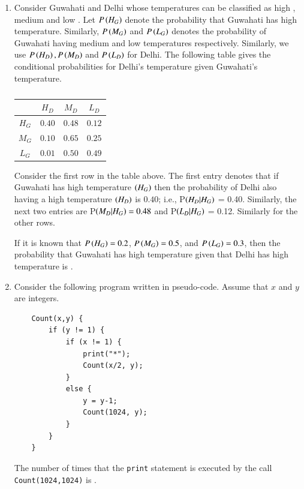 \documentclass[journal,12pt,onecolumn]{IEEEtran}
\theoremstyle{remark}
\begin{document}
\begin{enumerate}
\hfill{}

\item Consider Guwahati  and Delhi  whose temperatures can be classified as high , medium  and low . Let $P\left(H_G\right)$ denote the probability that Guwahati has high temperature. Similarly, $P\left(M_G\right)$ and $P\left(L_G\right)$ denotes the probability of Guwahati having medium and low temperatures respectively. Similarly, we use $P\left(H_D\right), P\left(M_D\right)$ and $P\left(L_D\right)$ for Delhi.
\newline
The following table gives the conditional probabilities for Delhi's temperature given Guwahati's temperature.

\begin{table}[h]
	\centering
	\begin{tabular}{|c|ccc|}
		\hline
		& $H_D$ & $M_D$ & $L_D$ \\ \hline
		$H_G$ & $0.40$ & $0.48$ & $0.12$ \\
		$M_G$ & $0.10$ & $0.65$ & $0.25$ \\
		$L_G$ & $0.01$ & $0.50$ & $0.49$ \\ \hline
	\end{tabular}
	\caption*{}
	\label{tab:q44_temps}
\end{table}
Consider the first row in the table above. The first entry denotes that if Guwahati has high temperature $\left(H_G\right)$ then the probability of Delhi also having a high temperature $\left(H_D\right)$ is $0.40$; i.e., P$\left(H_D | H_G\right)$ = 0.40. Similarly, the next two entries are P$\left(M_D | H_G\right) = 0.48$ and P$\left(L_D | H_G\right)$ = 0.12. Similarly for the other rows.

If it is known that $P\left(H_G\right) = 0.2$, $P\left(M_G\right) = 0.5$, and $P\left(L_G\right) = 0.3$, then the probability  that Guwahati has high temperature given that Delhi has high temperature is \underline{\hspace{2cm}}.

\hfill{}

\item Consider the following program written in pseudo-code. Assume that $x$ and $y$ are integers.
\begin{verbatim}
	Count(x,y) {
		if (y != 1) {
			if (x != 1) {
				print("*");
				Count(x/2, y);
			}
			else {
				y = y-1;
				Count(1024, y);
			}
		}
	}
\end{verbatim}
The number of times that the \texttt{print} statement is executed by the call \texttt{Count(1024,1024)} is \underline{\hspace{2cm}}.


\end{enumerate}
\end{document}
